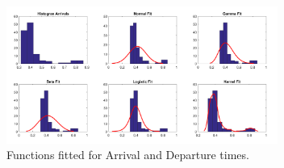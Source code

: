 \documentclass[conference]{IEEEtran}
\begin{document}

\begin{figure}[!t]
	\centering
	\includegraphics[width=3.5in]{fits.png}
	
	\caption{Functions fitted for Arrival and Departure times.}
	\label{fig4}
\end{figure}
\end{document}
